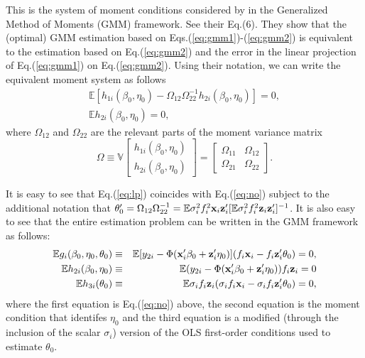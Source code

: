 \documentclass[11pt]{article}
\begin{document}
This is the system of moment conditions  considered by \cite{breusch/etal:99} %
in the Generalized Method of Moments (GMM) framework. See their Eq.(6). %
They show that the (optimal) GMM estimation based on Eqs.(\ref{eq:gmm1})-(\ref{eq:gmm2}) is equivalent to the estimation based on Eq.(\ref{eq:gmm2}) and the error in the linear projection of Eq.(\ref{eq:gmm1}) on Eq.(\ref{eq:gmm2}). Using their notation, we can write the equivalent moment system as follows
\begin{eqnarray}\label{eq:lp}
\mathbb{E}[h_{1i}(\beta_0, \eta_0)- \Omega_{12}\Omega_{22}^{-1}h_{2i}(\beta_0, \eta_0)] = 0,\\\label{eq:h2}
\mathbb{E}h_{2i}(\beta_0, \eta_0)  = 0,
\end{eqnarray}
where $\Omega_{12}$ and $\Omega_{22}$ are the relevant parts of the moment variance matrix
\[\Omega\equiv \mathbb{V}\left[\begin{array}{c}h_{1i}(\beta_0, \eta_0)\\h_{2i}(\beta_0, \eta_0)\end{array}\right]=\left[\begin{array}{cc}\Omega_{11}&\Omega_{12}\\ \Omega_{21}&\Omega_{22}\end{array}\right].\] 

It is easy to see that Eq.(\ref{eq:lp}) coincides with Eq.(\ref{eq:no}) subject to the additional notation that $\theta'_0 = \Omega_{12}\Omega_{22}^{-1}=\mathbb{E}\sigma^2_i f^2_i \mathbf{x}_i \mathbf{z}_i' [\mathbb{E}\sigma^2_i f^2_i \mathbf{z}_i \mathbf{z}'_i]^{-1}$. It is also easy to see that the entire estimation problem can be written in the GMM framework as follows:
\begin{eqnarray}\label{eq:1}
    \mathbb{E} g_i(\beta_0, \eta_0, \theta_0) &\equiv &\mathbb{E} [y_{2i} - \Phi(\mathbf{x}'_i\beta_0 +\mathbf{z}_i'\eta_0)](f_i\mathbf{x}_i - f_i\mathbf{z}_i'\theta_0) = 0, \\\label{eq:2}
\mathbb{E}h_{2i}(\beta_0, \eta_0) &\equiv& \mathbb{E}(y_{2i}-\Phi(\mathbf{x}_i' \beta_0 + \mathbf{z}_i'\eta_0) )f_i\mathbf{z}_i = 0\\\label{eq:3}
\mathbb{E}h_{3i}(\theta_0) &\equiv& \mathbb{E}\sigma_i f_i \mathbf{z}_i(\sigma_i f_i\mathbf{x}_i - \sigma_i f_i\mathbf{z}_i'\theta_0)=0,  
\end{eqnarray}
where the first equation is Eq.(\ref{eq:no}) above, %
the second equation is the moment condition that identifes $\eta_0$ and the third equation is a modified (through the inclusion of the scalar $\sigma_i$) version of the OLS first-order conditions used to estimate $\theta_0$. 
\end{document}
